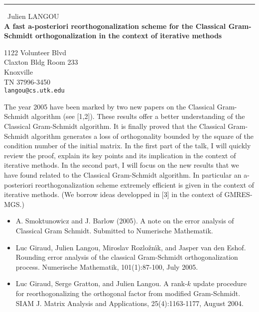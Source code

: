 \documentclass{report}
\begin{document}
\begin{center}
\rule{6in}{1pt} \
{\large Julien LANGOU \\
{\bf A fast a-posteriori reorthogonalization scheme for the Classical Gram-Schmidt orthogonalization in the context of iterative methods }}

1122 Volunteer Blvd \\ Claxton Bldg Room 233 \\ Knoxville \\ TN 37996-3450
\\
{\tt langou@cs.utk.edu}\end{center}


The year 2005 have been marked by two new papers on the Classical
Gram-Schmidt algorithm (see [1,2]). These results offer a better
understanding of the Classical Gram-Schmidt algorithm. It is finally
proved that the Classical Gram-Schmidt algorithm generates a loss of
orthogonality bounded by the square of the condition number of the
initial matrix. In the first part of the talk,
I will quickly review the proof, explain its key points and its
implication in the context of iterative methods. In the second part, I
will focus on the new results that we have found related to the Classical
Gram-Schmidt algorithm. In particular an a-posteriori reorthogonalization
scheme extremely efficient is given in the context of iterative methods.
(We borrow ideas developped in [3] in the context of GMRES-MGS.)


\begin{itemize}
\item A. Smoktunowicz and J. Barlow (2005).
A note on the error analysis of Classical Gram Schmidt.
Submitted to Numerische Mathematik.
\item Luc Giraud, Julien Langou, Miroslav Rozlo\v{z}n\'{\i}k, and Jasper van den Eshof.
Rounding error analysis of the classical Gram-Schmidt orthogonalization process.
Numerische Mathematik, 101(1):87-100, July 2005.
\item Luc Giraud, Serge Gratton, and Julien Langou.
A rank-$k$ update procedure for reorthogonalizing the orthogonal factor
from modified Gram-Schmidt.
SIAM J. Matrix Analysis and Applications, 25(4):1163-1177, August 2004.
\end{itemize}
\end{document}
